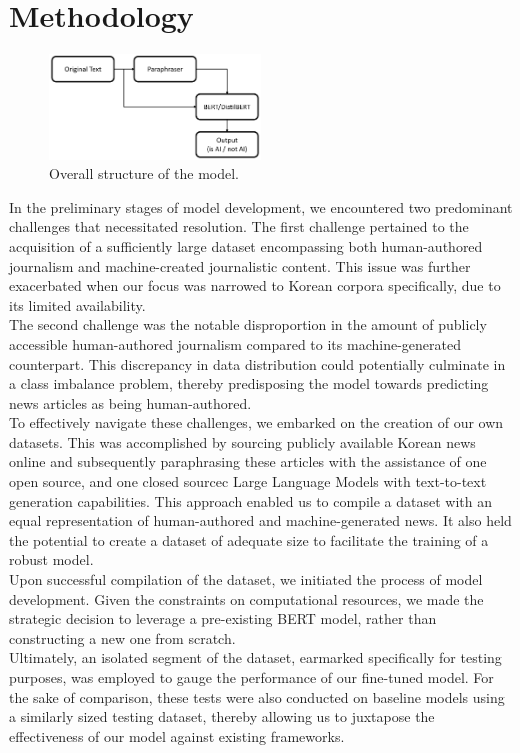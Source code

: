 \documentclass{article}
\begin{document}
\section{Methodology}
\begin{figure}[ht]
\centering
\includegraphics[width=0.5\textwidth]{structure.png}
\caption{Overall structure of the model.}
\label{fig:structure}
\end{figure}
\null\quad In the preliminary stages of model development, we encountered two predominant challenges that necessitated resolution.
The first challenge pertained to the acquisition of a sufficiently large dataset encompassing both human-authored journalism and machine-created journalistic content.
This issue was further exacerbated when our focus was narrowed to Korean corpora specifically, due to its limited availability. \\
\null\quad The second challenge was the notable disproportion in the amount of publicly accessible human-authored journalism compared to its machine-generated counterpart.
This discrepancy in data distribution could potentially culminate in a class imbalance problem,
thereby predisposing the model towards predicting news articles as being human-authored. \\
\null\quad To effectively navigate these challenges, we embarked on the creation of our own datasets.
This was accomplished by sourcing publicly available Korean news online and subsequently paraphrasing these articles with the assistance of one open source, and one closed sourcec Large Language Models with text-to-text generation capabilities.
This approach enabled us to compile a dataset with an equal representation of human-authored and machine-generated news.
It also held the potential to create a dataset of adequate size to facilitate the training of a robust model. \\
\null\quad Upon successful compilation of the dataset, we initiated the process of model development.
Given the constraints on computational resources, we made the strategic decision to leverage a pre-existing BERT model, rather than constructing a new one from scratch. \\
\null\quad Ultimately, an isolated segment of the dataset, earmarked specifically for testing purposes, was employed to gauge the performance of our fine-tuned model.
For the sake of comparison, these tests were also conducted on baseline models using a similarly sized testing dataset,
thereby allowing us to juxtapose the effectiveness of our model against existing frameworks.
\end{document}
